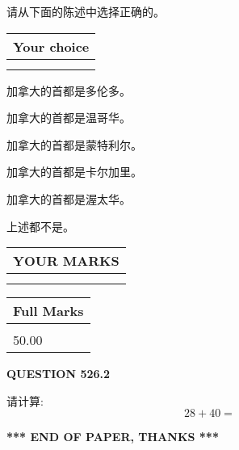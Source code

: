 \documentclass{ctexart}
\begin{document}
  
请从下面的陈述中选择正确的。
  
  
\noindent\hspace{3.0in} \begin{tabular}{|l|}
\hline
Your choice \\
\hline
 \\ 
 \\ 
\hline
\end{tabular}
  
  
 
 
加拿大的首都是多伦多。
 
 
加拿大的首都是温哥华。
 
 
加拿大的首都是蒙特利尔。
 
 
加拿大的首都是卡尔加里。
 
 
加拿大的首都是渥太华。
 
 
 上述都不是。
 
 
  
\vspace{0.2in}
  
\noindent\begin{tabular}{|l|}
\hline
 YOUR MARKS  \\
\hline
 \\ 
 \\ 
\hline
\end{tabular}
\hspace{0.05in} \begin{tabular}{|l|}
\hline
 Full Marks  \\
\hline
 \\ 
50.00 \\
\hline
\end{tabular}
{\textbf{\Large{QUESTION
526.2 
}}}
  
  
 
请计算:
\begin{equation}
28 +  %
40 = \nonumber
\end{equation}
 

 

 
   
   
 \vspace{0.2in}
 
   
   
   
   
\vspace{1.0in} 
{\textbf{\large{ *** END OF PAPER, THANKS *** }}} 
   
\end{document}
